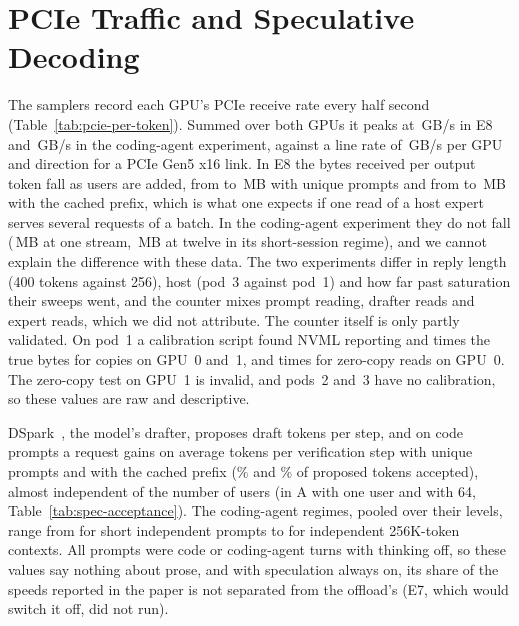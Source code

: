 \section{PCIe Traffic and Speculative Decoding}\label{sec:bytes}

The samplers record each GPU's PCIe receive rate every half second (Table~\ref{tab:pcie-per-token}). Summed over both
GPUs it peaks at \,GB/s in E8 and \,GB/s in the coding-agent
experiment, against a line rate of \,GB/s per GPU and direction for a PCIe Gen5 x16 link.
In E8 the bytes received per output token fall as users are added, from  to
\,MB with unique prompts and from  to
\,MB with the cached prefix, which is what one expects if one read of a host expert
serves several requests of a batch. In the coding-agent experiment they do not fall
(\,MB at one stream, \,MB at twelve in its short-session
regime), and we cannot explain the difference with these data. The two experiments differ in reply length (400 tokens
against 256), host (pod~3 against pod~1) and how far past saturation their sweeps went, and the counter mixes prompt
reading, drafter reads and expert reads, which we did not attribute. The counter itself is only partly validated. On
pod~1 a calibration script found NVML reporting  and
 times the true bytes for copies on GPU~0 and~1, and
 times for zero-copy reads on GPU~0. The zero-copy test on GPU~1 is invalid, and
pods~2 and~3 have no calibration, so these values are raw and descriptive.

DSpark~\citep{cheng2026dspark,leviathan2023speculative}, the model's drafter, proposes  draft tokens per
step, and on code prompts a request gains on average  tokens per verification step with
unique prompts and  with the cached prefix (\% and
\% of proposed tokens accepted), almost independent of the number of users (in A
 with one user and  with 64,
Table~\ref{tab:spec-acceptance}). The coding-agent regimes, pooled over their levels, range from
 for short independent prompts to  for independent
256K-token contexts. All prompts were code or coding-agent turns with thinking off, so these values say nothing about
prose, and with speculation always on, its share of the speeds reported in the paper is not separated from the
offload's (E7, which would switch it off, did not run).



